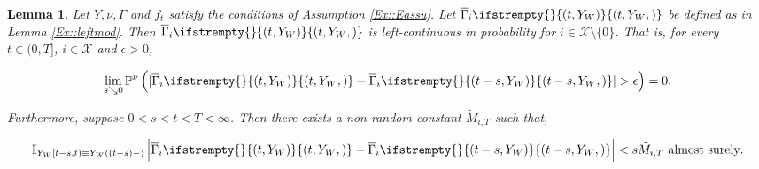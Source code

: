 \documentclass[12pt]{article}
\newcommand{\mb}{\mathbb}
\newcommand{\mc}{\mathcal}
\newcommand{\ov}{\overline}
\newcommand{\te}{\text}
\newcommand{\ep}{\epsilon}
\newcommand{\pr}{\mb{P}}							%
\newcommand{\sta}{\mc{X}}							%
\newcommand{\vind}[1]{_{#1}}						%
\newcommand{\tme}[1]{(#1)}							%
\newcommand{\tmi}[1]{#1}							%
\newcommand{\stpara}[1]{_{#1}}						%
\newcommand{\tmepro}[3]{
\ifstrempty{#3}{
	\left(#1,#2\right)}{
	\left(#1,#2,#3\right)}}							%
\newcommand{\Xg}{Y}									%
\newcommand{\alt}[1]{\tilde{#1}}					%
\newcommand{\ratee}{\Gamma}							%
\newcommand{\grate}{\ov{\ratee}}					%
\newcommand{\mm}{\nu}								%
\newcommand{\const}{M}								%
\newcommand{\sttpara}[2]{_{#1,#2}}					%
\newcommand{\mpara}[1]{^{#1}}						%
\newtheorem{lem}[thms]{Lemma}
\begin{document}
\begin{lem}
Let \(\Xg,\mm,\ratee\) and \(f_t\) satisfy the conditions of Assumption \ref{Ex::Eassu}. Let \(\grate\stpara{i}\tmepro{t}{\Xg\vind{W}}{}\) be defined as in Lemma \ref{Ex::leftmod}. Then \(\grate\stpara{i}\tmepro{t}{\Xg\vind{W}}{}\) is left-continuous in probability for \(i \in \sta\setminus\{0\}\). That is, for every \(t \in (0,T]\), \(i \in \sta\) and \(\ep > 0\),

\[\lim_{s \searrow 0}\pr\mpara{\mm}\left(|\grate\stpara{i}\tmepro{t}{\Xg\vind{W}}{}- \grate\stpara{i}\tmepro{t-s}{\Xg\vind{W}}{}| > \ep\right) = 0.\]

Furthermore, suppose \(0 < s < t < T < \infty\). Then there exists a non-random constant \(\alt{\const}\sttpara{i}{T}\) such that,

\begin{equation}
\mb{I}_{\Xg\vind{W}\tmi{[t-s,t)} \equiv \Xg\vind{W}\tme{(t-s)-}}\left|\grate\stpara{i}\tmepro{t}{\Xg\vind{W}}{}- \grate\stpara{i}\tmepro{t-s}{\Xg\vind{W}}{}\right| < s\alt{\const}\sttpara{i}{T} \te{ almost surely}.
\label{Ex::ptwslip}
\end{equation}

\label{Ex::pleft}
\end{lem}
\end{document}
